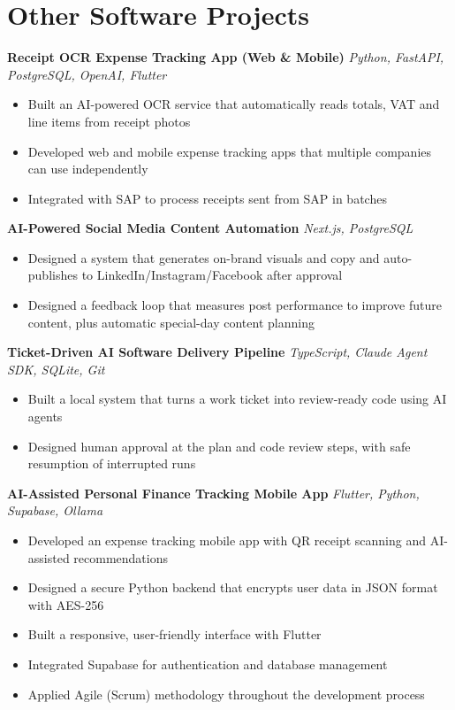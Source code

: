 \documentclass[10pt,a4paper]{extarticle}
\begin{document}
\section{Other Software Projects}
\textbf{Receipt OCR Expense Tracking App (Web \& Mobile)} \hfill \textit{Python, FastAPI, PostgreSQL, OpenAI, Flutter}
\begin{itemize}[leftmargin=*,noitemsep,topsep=0pt]
    \item Built an AI-powered OCR service that automatically reads totals, VAT and line items from receipt photos
    \item Developed web and mobile expense tracking apps that multiple companies can use independently
    \item Integrated with SAP to process receipts sent from SAP in batches
\end{itemize}
\textbf{AI-Powered Social Media Content Automation} \hfill \textit{Next.js, PostgreSQL}
\begin{itemize}[leftmargin=*,noitemsep,topsep=0pt]
    \item Designed a system that generates on-brand visuals and copy and auto-publishes to LinkedIn/Instagram/Facebook after approval
    \item Designed a feedback loop that measures post performance to improve future content, plus automatic special-day content planning
\end{itemize}
\textbf{Ticket-Driven AI Software Delivery Pipeline} \hfill \textit{TypeScript, Claude Agent SDK, SQLite, Git}
\begin{itemize}[leftmargin=*,noitemsep,topsep=0pt]
    \item Built a local system that turns a work ticket into review-ready code using AI agents
    \item Designed human approval at the plan and code review steps, with safe resumption of interrupted runs
\end{itemize}
\textbf{AI-Assisted Personal Finance Tracking Mobile App} \hfill \textit{Flutter, Python, Supabase, Ollama}
\begin{itemize}[leftmargin=*,noitemsep,topsep=0pt]
    \item Developed an expense tracking mobile app with QR receipt scanning and AI-assisted recommendations
    \item Designed a secure Python backend that encrypts user data in JSON format with AES-256
    \item Built a responsive, user-friendly interface with Flutter
    \item Integrated Supabase for authentication and database management
    \item Applied Agile (Scrum) methodology throughout the development process
\end{itemize}
\end{document}
